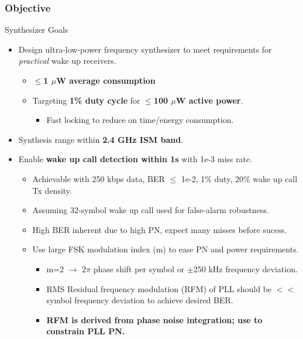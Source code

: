 \documentclass[t, screen, aspectratio=43]{beamer}
\begin{document}
\begin{frame}
	\frametitle{Objective}
	\begin{block}{Synthesizer Goals}
		\begin{itemize}
			\footnotesize
			\item Design ultra-low-power frequency synthesizer to meet requirements for \textit{practical} wake up receivers.
			\begin{itemize}
				\footnotesize
				\item \textbf{$\leq$1 $\mu$W average consumption}
				\item Targeting \textbf{1\% duty cycle} for \textbf{$\leq$100 $\mu$W active power}.
				\begin{itemize}
					\item Fast locking to reduce on time/energy consumption.
				\end{itemize}
			\end{itemize} 
			\item Synthesis range within \textbf{2.4 GHz ISM band}.
			\item Enable \textbf{wake up call detection within 1s} with 1e-3 miss rate.
			\begin{itemize}
				\scriptsize
				\item Achievable with 250 kbps data, BER $\leq$ 1e-2, 1\% duty, 20\% wake up call Tx density.
				\item Assuming 32-symbol wake up call used for false-alarm robustness.
				\item High BER inherent due to high PN, expect many misses before sucess.  
				\item Use large FSK modulation index (m) to ease PN and power requirements. 
				\begin{itemize}
					\scriptsize
					\item m=2 $\rightarrow$ 2$\pi$ phase shift per symbol or $\pm$250 kHz frequency deviation.
					\item RMS Residual frequency modulation (RFM) of PLL should be $<<$ symbol frequency deviation to achieve desired BER.
					\item \textbf{RFM is derived from phase noise integration; use to constrain PLL PN.}
				\end{itemize}
			\end{itemize}      
		\end{itemize}
	\end{block}
\end{frame}

\end{document}
